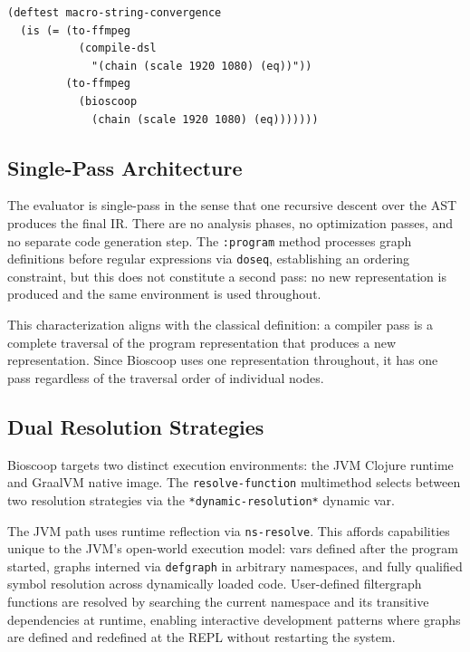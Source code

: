 \documentclass[conference]{IEEEtran}
\begin{document}
\begin{lstlisting}[caption={Convergence test pattern}]
(deftest macro-string-convergence
  (is (= (to-ffmpeg
           (compile-dsl
             "(chain (scale 1920 1080) (eq))"))
         (to-ffmpeg
           (bioscoop
             (chain (scale 1920 1080) (eq)))))))
\end{lstlisting}

\subsection{Single-Pass Architecture}

The evaluator is single-pass in the sense that one recursive descent over the AST produces the final IR. There are no analysis phases, no optimization passes, and no separate code generation step. The \texttt{:program} method processes graph definitions before regular expressions via \texttt{doseq}, establishing an ordering constraint, but this does not constitute a second pass: no new representation is produced and the same environment is used throughout.

This characterization aligns with the classical definition: a compiler pass is a complete traversal of the program representation that produces a new representation. Since Bioscoop uses one representation throughout, it has one pass regardless of the traversal order of individual nodes.

\subsection{Dual Resolution Strategies}

Bioscoop targets two distinct execution environments: the JVM Clojure runtime and GraalVM native image. The \texttt{resolve-function} multimethod selects between two resolution strategies via the \texttt{*dynamic-resolution*} dynamic var.

The JVM path uses runtime reflection via \texttt{ns-resolve}. This affords capabilities unique to the JVM's open-world execution model: vars defined after the program started, graphs interned via \texttt{defgraph} in arbitrary namespaces, and fully qualified symbol resolution across dynamically loaded code. User-defined filtergraph functions are resolved by searching the current namespace and its transitive dependencies at runtime, enabling interactive development patterns where graphs are defined and redefined at the REPL without restarting the system.
\end{document}
